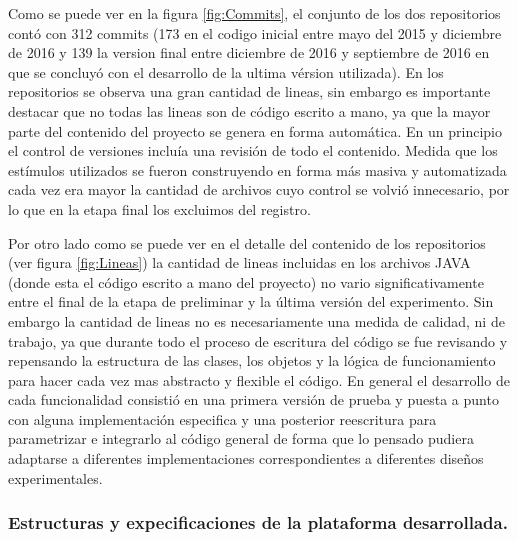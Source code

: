 \documentclass{article}
\begin{document}
    Como se puede ver en la figura \ref{fig:Commits}, el conjunto de los dos repositorios contó con 312 commits (173 en el codigo inicial entre mayo del 2015 y diciembre de 2016 y 139 la version final entre diciembre de 2016 y septiembre de 2016 en que se concluyó con el desarrollo de la ultima vérsion utilizada). En los repositorios se observa una gran cantidad de lineas, sin embargo es importante destacar que no todas las lineas son de código escrito a mano, ya que la mayor parte del contenido del proyecto se genera en forma automática. En un principio el control de versiones incluía una revisión de todo el contenido. Medida que los estímulos utilizados se fueron construyendo en forma más masiva y automatizada cada vez era mayor la cantidad de archivos cuyo control se volvió innecesario, por lo que en la etapa final los excluimos del registro. 
    
    Por otro lado como se puede ver en el detalle del contenido de los repositorios (ver figura \ref{fig:Lineas}) la cantidad de lineas incluidas en los archivos JAVA (donde esta el código escrito a mano del proyecto) no vario significativamente entre el final de la etapa de preliminar y la última versión del experimento. Sin embargo la cantidad de lineas no es necesariamente una medida de calidad, ni de trabajo, ya que durante todo el proceso de escritura del código se fue revisando y repensando la estructura de las clases, los objetos y la lógica de funcionamiento para hacer cada vez mas abstracto y flexible el código. En general el desarrollo de cada funcionalidad consistió en una primera versión de prueba y puesta a punto con alguna implementación especifica y una posterior reescritura para parametrizar e integrarlo al código general de forma que lo pensado pudiera adaptarse a diferentes implementaciones correspondientes a diferentes diseños experimentales. 
    
    \subsubsection{Estructuras y expecificaciones de la plataforma desarrollada.}
    
\end{document}
